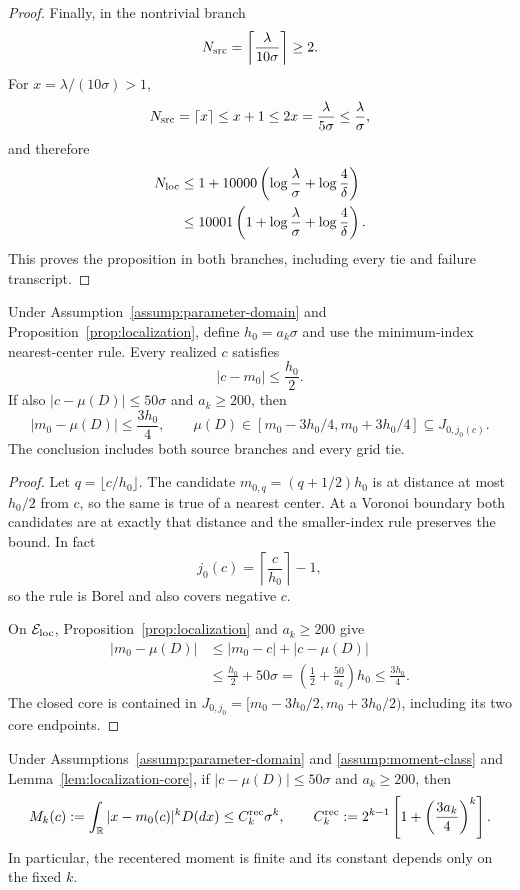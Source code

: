 \begin{proof}
Finally, in the nontrivial branch
\[
 N_{\rm src}=\left\lceil\frac\lambda{10\sigma}\right\rceil\geq2.
\]
For $x=\lambda/(10\sigma)>1$,
\[
 N_{\rm src}=\lceil x\rceil\leq x+1\leq2x
 =\frac\lambda{5\sigma}\leq\frac\lambda\sigma,
\]
and therefore
\[
\begin{aligned}
 N_{\rm loc}
 &\leq1+10000\left(\log\frac\lambda\sigma+\log\frac4\delta\right)\\
 &\leq10001\left(1+\log\frac\lambda\sigma+\log\frac4\delta\right).
\end{aligned}
\]
This proves the proposition in both branches, including every tie and failure
transcript.
\end{proof}

\begin{lemma}\label{lem:localization-core}
Under Assumption~\ref{assump:parameter-domain} and
Proposition~\ref{prop:localization}, define $h_0=a_k\sigma$ and use the
minimum-index nearest-center rule.  Every realized $c$ satisfies
\[
 |c-m_0|\leq\frac{h_0}{2}.
\]
If also $|c-\mu(D)|\leq50\sigma$ and $a_k\geq200$, then
\[
 |m_0-\mu(D)|\leq\frac{3h_0}{4},\qquad
 \mu(D)\in[m_0-3h_0/4,m_0+3h_0/4]
 \subseteq J_{0,j_0(c)}.
\]
The conclusion includes both source branches and every grid tie.
\end{lemma}

\begin{proof}
Let $q=\lfloor c/h_0\rfloor$.  The candidate
$m_{0,q}=(q+1/2)h_0$ is at distance at most $h_0/2$ from $c$, so the same
is true of a nearest center.  At a Voronoi boundary both candidates are at
exactly that distance and the smaller-index rule preserves the bound.  In
fact
\[
 j_0(c)=\left\lceil\frac c{h_0}\right\rceil-1,
\]
so the rule is Borel and also covers negative $c$.

On $\mathcal E_{\rm loc}$, Proposition~\ref{prop:localization} and
$a_k\geq200$ give
\[
\begin{aligned}
 |m_0-\mu(D)|
 &\leq|m_0-c|+|c-\mu(D)|\\
 &\leq\frac{h_0}{2}+50\sigma
 =\left(\frac12+\frac{50}{a_k}\right)h_0
 \leq\frac{3h_0}{4}.
\end{aligned}
\]
The closed core is contained in
$J_{0,j_0}=[m_0-3h_0/2,m_0+3h_0/2)$, including its two core endpoints.
\end{proof}

\begin{lemma}\label{lem:recentered-moment}
Under Assumptions~\ref{assump:parameter-domain} and
\ref{assump:moment-class} and Lemma~\ref{lem:localization-core}, if
$|c-\mu(D)|\leq50\sigma$ and $a_k\geq200$, then
\[
 M_k(c):=\int_{\mathbb R}|x-m_0(c)|^kD(dx)
 \leq C_k^{\rm rec}\sigma^k,
 \qquad
 C_k^{\rm rec}:=2^{k-1}\left[1+\left(\frac{3a_k}{4}\right)^k\right].
\]
In particular, the recentered moment is finite and its constant depends only
on the fixed $k$.
\end{lemma}

